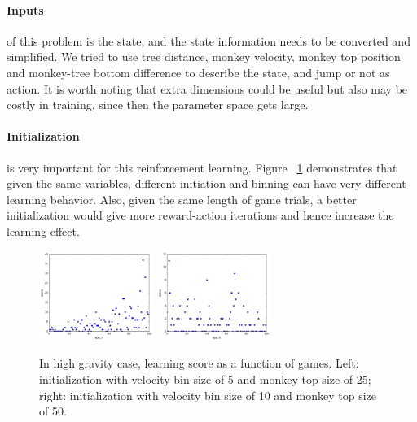 \documentclass[11pt]{article}
\begin{document}
\paragraph{Inputs} of this problem is the state, and the state information needs to be converted and simplified. We tried to use tree distance, monkey velocity, monkey top position and monkey-tree bottom difference to describe the state, and jump or not as action. It is worth noting that extra dimensions could be useful but also may be costly in training, since then the parameter space gets large. 

\paragraph{Initialization} is very important for this reinforcement learning. Figure ~\ref{QInitial} demonstrates that given the same variables, different initiation and binning can have very different learning behavior. Also, given the same length of game trials, a better initialization would give more reward-action iterations and hence increase the learning effect.
\begin{figure}[] 
\centering
        \includegraphics[width=0.33\textwidth]{Plot/learn_vel5_mtop25.png}
        \includegraphics[width=0.33\textwidth]{Plot/learn_vel10_mtop50.png}
        \caption{In high gravity case, learning score as a function of games. Left: initialization with velocity bin size of 5 and monkey top size of 25; right: initialization with velocity bin size of 10 and monkey top size of 50.}
            \label{QInitial}
\end{figure}
\end{document}
